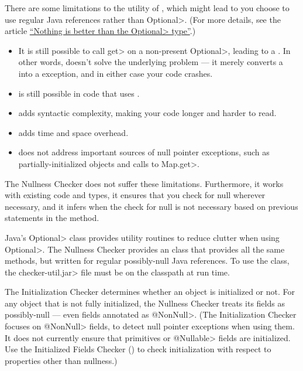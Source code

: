 There are some limitations to the utility of , which might
lead to you choose to use regular Java references rather than \<Optional>.
(For more details, see the article
\href{https://homes.cs.washington.edu/~mernst/advice/nothing-is-better-than-optional.html}{``Nothing
  is better than the \<Optional> type''}.)

\begin{itemize}
\item
  It is still possible to call \<get> on a non-present \<Optional>, leading
  to a .  In other words, 
  doesn't solve the underlying problem --- it merely converts a
   into a 
  exception, and in either case your code crashes.
\item
   is still possible in code that uses .
\item
   adds syntactic complexity, making your code longer and harder to
  read.
\item
   adds time and space overhead.
\item
   does not address important sources of null pointer
  exceptions, such as partially-initialized objects and calls to \<Map.get>.
\end{itemize}

The Nullness Checker does not suffer these limitations.  Furthermore, it
works with existing code and types, it ensures that you check for null
wherever necessary, and it infers when the check for null is not necessary
based on previous statements in the method.

Java's \<Optional> class provides utility routines to reduce clutter when
using \<Optional>.  The Nullness Checker provides an
 class that provides all the same methods,
but written for regular possibly-null Java references.
To use the  class, the
\<checker-util.jar> file must be on the classpath at run time.



The Initialization Checker determines whether an object is initialized or
not.  For any object that is not fully initialized, the Nullness Checker
treats its fields as possibly-null --- even fields annotated as
\<@NonNull>.
(The Initialization Checker focuses on \<@NonNull> fields, to detect null
pointer exceptions when using them.  It does not
currently ensure that primitives or \<@Nullable> fields are initialized.
Use the Initialized Fields Checker
() to check initialization with
respect to properties other than nullness.)

